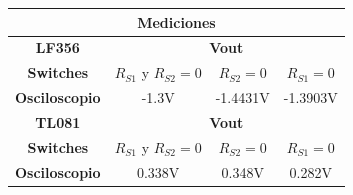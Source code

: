 \documentclass[a4paper]{article}
\begin{document}
\begin{table}[H]
\begin{center}
\begin{tabular}{|c|c|c|c|}
\hline
\multicolumn{4}{|c|}{\textbf{Mediciones}}                                        \\ \hline
\textbf{LF356}        & \multicolumn{3}{c|}{\textbf{Vout}}                       \\ \hline
\textbf{Switches}     & $R_{S1}$ y $ R_{S2} = 0$ & $ R_{S2} = 0$ & $ R_{S1} = 0$ \\ \hline
\textbf{Osciloscopio} & -1.3V                    & -1.4431V      & -1.3903V      \\ \hline
\textbf{TL081}        & \multicolumn{3}{c|}{\textbf{Vout}}                       \\ \hline
\textbf{Switches}     & $R_{S1}$ y $ R_{S2} = 0$ & $ R_{S2} = 0$ & $ R_{S1} = 0$ \\ \hline
\textbf{Osciloscopio} & 0.338V                   & 0.348V        & 0.282V        \\ \hline
\end{tabular}
\end{center}
\end{table}
\end{document}
